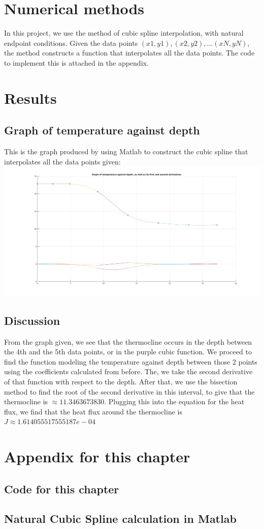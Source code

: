 \documentclass[openany]{book}
\begin{document}
	\section{Numerical methods}
	In this project, we use the method of cubic spline interpolation, with natural endpoint conditions. Given the data points ${(x1, y1), (x2, y2), ... (xN, yN)}$, the method constructs a function that interpolates all the data points. The code to implement this is attached in the appendix.
	
	\section{Results}
    
    \subsection{Graph of temperature against depth}
    This is the graph produced by using Matlab to construct the cubic spline that interpolates all the data points given:\\
    \includegraphics[scale=0.25]{Graph.png}
    \subsection{Discussion}
    From the graph given, we see that the thermocline occurs in the depth between the 4th and the 5th data points, or in the purple cubic function. We proceed to find the function modeling the temperature against depth between those 2 points using the coefficients calculated from before. The, we take the second derivative of that function with respect to the depth. After that, we use the bisection method to find the root of the second derivative in this interval, to give that the thermocline is ${\approx 11.3463673830}$. Plugging this into the equation for the heat flux, we find that the heat flux around the thermocline is ${J\approx1.614055517555187e-04}$
    \section{Appendix for this chapter}
    \subsection{Code for this chapter}
    
    \subsection{Natural Cubic Spline calculation in Matlab}
    
\end{document}
